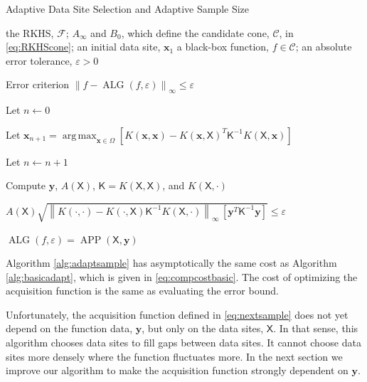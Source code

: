 \documentclass[]{mcom-l}
\theoremstyle{remark}
\DeclareMathOperator*{\argmax}{arg\,max}
\DeclareMathOperator{\ALG}{ALG}
\DeclareMathOperator{\APP}{APP}
\newcommand{\mK}{\mathsf{K}}
\newcommand{\mX}{\mathsf{X}}
\newcommand{\bx}{{\boldsymbol{x}}}
\newcommand{\by}{{\boldsymbol{y}}}
\newcommand{\cc}{\mathcal{C}}
\newcommand{\calf}{{\mathcal{F}}}
\newcommand{\norm}[2][{}]{\ensuremath{\left \lVert #2 \right \rVert}_{#1}}
\begin{document}
\begin{algorithm}[H]
	\caption{Adaptive Data Site Selection and Adaptive Sample Size \label{alg:adaptsample}}
	\begin{algorithmic}
		\PARAM the RKHS, $\calf$; $A_\infty$ and $B_0$, which define  the candidate cone, $\cc$, in \eqref{eq:RKHScone}; an initial data site, $\bx_1$
		\INPUT a black-box function, $f \in \cc$; an absolute error tolerance, $\varepsilon>0$
		
		\Ensure Error criterion $\norm[\infty]{f - \ALG(f,\varepsilon)} \le \varepsilon$
		
		\State Let $n \leftarrow 0$
		
		\Repeat
		
		
		\State Let $ \bx_{n+1} = \displaystyle \argmax_{\bx \in \Omega} [K(\bx,\bx) - K(\bx,\mX)^T \mK^{-1} K(\mX,\bx)]$
		
		\EndIf
		
		\State Let $n \leftarrow n + 1$
		
		\State Compute $\by$, $A(\mX)$, $\mK = K(\mX,\mX)$, and $K(\mX,\cdot)$
		
		\Until $A(\mX) \sqrt{\norm[\infty]{K(\cdot,\cdot) - K(\cdot,\mX) \mK^{-1} K(\mX,\cdot)} \, [\by^T \mK^{-1} \by] }  \le \varepsilon$
		
		\RETURN $\ALG(f,\varepsilon) = \APP(\mX,\by)$
		
	\end{algorithmic}
\end{algorithm}

Algorithm \ref{alg:adaptsample} has asymptotically the same cost as Algorithm \ref{alg:basicadapt}, which is given in \eqref{eq:compcostbasic}.  The cost of optimizing the acquisition function is the same as evaluating the error bound.

Unfortunately, the acquisition function defined in \eqref{eq:nextsample} does not yet depend on the function data, $\by$, but only on the data sites, $\mX$.  In that sense, this algorithm chooses data sites to fill gaps between data sites.  It cannot choose data sites more densely where the function  fluctuates more.  In the next section we improve our algorithm to make the acquisition function strongly dependent on $\by$.





\end{document}
